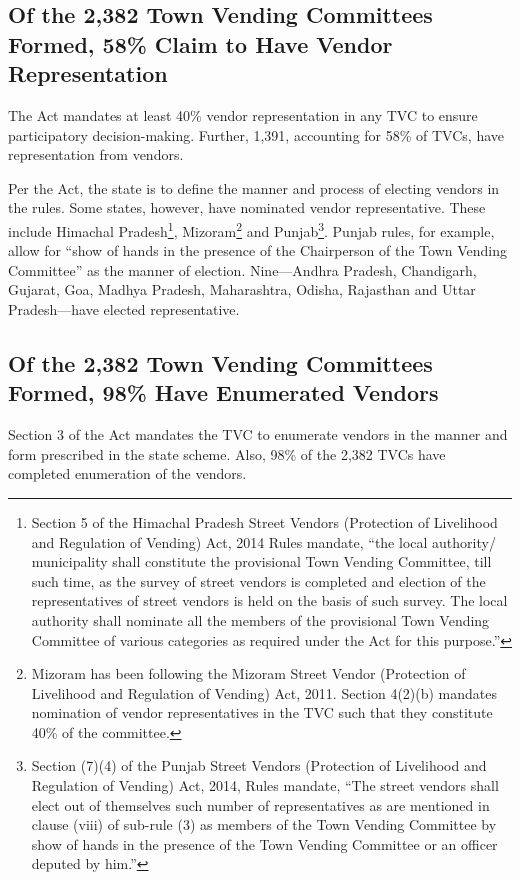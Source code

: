 \documentclass[a4paper, 12pt, twoside]{article}
\begin{document}
\subsection{Of the 2,382 Town Vending Committees Formed, 58\% Claim to Have Vendor Representation}
	The Act mandates at least 40\% vendor representation in any TVC to ensure participatory decision-making. Further, 1,391, accounting for 58\% of TVCs, have representation from vendors.

	Per the Act, the state is to define the manner and process of electing vendors in the rules. Some states, however, have nominated vendor representative. These include Himachal Pradesh\footnote{Section 5 of the Himachal Pradesh Street Vendors (Protection of Livelihood and Regulation of Vending) Act, 2014 Rules mandate, “the local authority/ municipality shall constitute the provisional Town Vending Committee, till such time, as the survey of street vendors is completed and election of the representatives of street vendors is held on the basis of such survey. The local authority shall nominate all the members of the provisional Town Vending Committee of various categories as required under the Act for this purpose.”}, Mizoram\footnote{Mizoram has been following the Mizoram Street Vendor (Protection of Livelihood and Regulation of Vending) Act, 2011. Section 4(2)(b) mandates nomination of vendor representatives in the TVC such that they constitute 40\% of the committee.} and Punjab\footnote{Section (7)(4) of the Punjab Street Vendors (Protection of Livelihood and Regulation of Vending) Act, 2014, Rules mandate, “The street vendors shall elect out of themselves such number of representatives as are mentioned in clause (viii) of sub-rule (3) as members of the Town Vending Committee by show of hands in the presence of the Town Vending Committee or an officer deputed by him.”}. Punjab rules, for example, allow for “show of hands in the presence of the Chairperson of the Town Vending Committee” as the manner of election. Nine—Andhra Pradesh, Chandigarh, Gujarat, Goa, Madhya Pradesh, Maharashtra, Odisha, Rajasthan and Uttar Pradesh—have elected representative.

\subsection{Of the 2,382 Town Vending Committees Formed, 98\% Have Enumerated Vendors}
	Section 3 of the Act mandates the TVC to enumerate vendors in the manner and form prescribed in the state scheme. Also, 98\% of the 2,382 TVCs have completed enumeration of the vendors.
\end{document}
